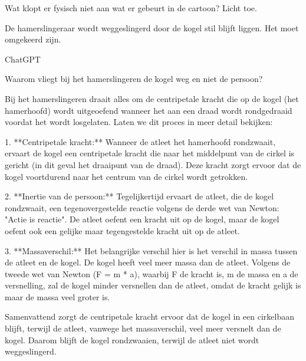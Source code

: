 
\begin{exercise}




\begin{minipage}[t]{.6\linewidth}
	Wat klopt er fysisch niet aan wat er gebeurt in de cartoon? Licht toe.
\end{minipage}
\hfill
\begin{minipage}[t]{.37\linewidth}
\end{minipage}


\begin{oplossing}

De hamerslingeraar wordt weggeslingerd door de kogel stil blijft liggen. Het moet omgekeerd zijn.




ChatGPT

Waarom vliegt bij het hamerslingeren de kogel weg en niet de persoon?

Bij het hamerslingeren draait alles om de centripetale kracht die op de kogel (het hamerhoofd) wordt uitgeoefend wanneer het aan een draad wordt rondgedraaid voordat het wordt losgelaten. Laten we dit proces in meer detail bekijken:

1. **Centripetale kracht:** Wanneer de atleet het hamerhoofd rondzwaait, ervaart de kogel een centripetale kracht die naar het middelpunt van de cirkel is gericht (in dit geval het draaipunt van de draad). Deze kracht zorgt ervoor dat de kogel voortdurend naar het centrum van de cirkel wordt getrokken.

2. **Inertie van de persoon:** Tegelijkertijd ervaart de atleet, die de kogel rondzwaait, een tegenovergestelde reactie volgens de derde wet van Newton: "Actie is reactie". De atleet oefent een kracht uit op de kogel, maar de kogel oefent ook een gelijke maar tegengestelde kracht uit op de atleet.

3. **Massaverschil:** Het belangrijke verschil hier is het verschil in massa tussen de atleet en de kogel. De kogel heeft veel meer massa dan de atleet. Volgens de tweede wet van Newton (F = m * a), waarbij F de kracht is, m de massa en a de versnelling, zal de kogel minder versnellen dan de atleet, omdat de kracht gelijk is maar de massa veel groter is.

Samenvattend zorgt de centripetale kracht ervoor dat de kogel in een cirkelbaan blijft, terwijl de atleet, vanwege het massaverschil, veel meer versnelt dan de kogel. Daarom blijft de kogel rondzwaaien, terwijl de atleet niet wordt weggeslingerd.

\end{oplossing}

\end{exercise}
